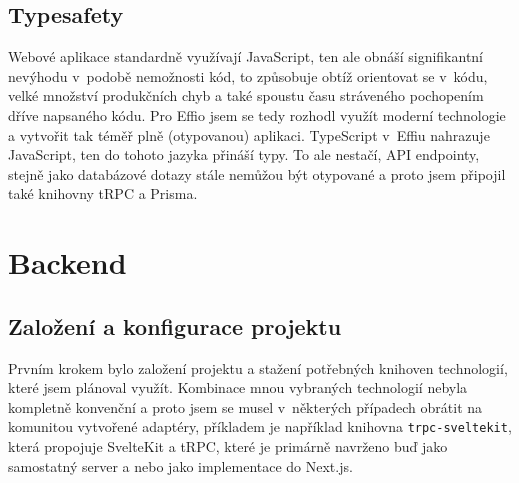 \documentclass[12pt, a4paper,
openright
]{report}
\let\oldchapter\chapter
\renewcommand{\chapter}{
	\clearpage
	\pagestyle{fancy}
	\oldchapter
}
\begin{document}

\section{Typesafety}
\label{sec:typesafety}

Webové aplikace standardně využívají JavaScript, ten ale obnáší signifikantní nevýhodu v~podobě nemožnosti  kód, to způsobuje obtíž orientovat se v~kódu, velké množství produkčních chyb a také spoustu času stráveného pochopením dříve napsaného kódu. Pro Effio jsem se tedy rozhodl využít moderní technologie a vytvořit tak téměř plně  (otypovanou) aplikaci. TypeScript v~Effiu nahrazuje JavaScript, ten do tohoto jazyka přináší typy. To ale nestačí, API endpointy, stejně jako databázové dotazy stále nemůžou být otypované a proto jsem připojil také knihovny tRPC a Prisma.

\chapter{Backend}

\section{Založení a konfigurace projektu}
Prvním krokem bylo založení projektu a stažení potřebných knihoven technologií, které jsem plánoval využít. Kombinace mnou vybraných technologií nebyla kompletně konvenční a proto jsem se musel v~některých případech obrátit na komunitou vytvořené adaptéry, příkladem je například knihovna \texttt{trpc-sveltekit}, která propojuje SvelteKit a tRPC, které je primárně navrženo buď jako samostatný server a nebo jako implementace do Next.js.
\end{document}
